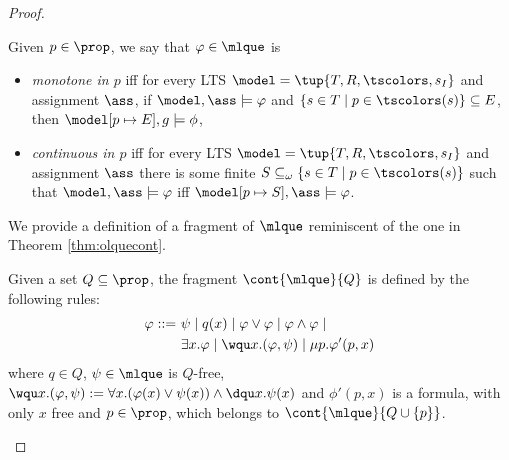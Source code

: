 \begin{proof}
%
%
\begin{definition}
Given $p \in \prop$, we say that $\varphi \in \mlque$ is
\begin{itemize}
\item \emph{monotone in $p$} iff for every LTS $\model=\tup{T,R,\tscolors, s_I}$ and assignment $\ass$, if $\model, \ass \models \varphi$ and $ \{s \in T \mid p\in \tscolors(s)\} \subseteq E$, then $\model[p \mapsto E], g\models \phi$,

\item %
    \emph{continuous in $p$} iff for every LTS $\model=\tup{T,R,\tscolors, s_I}$ and assignment $\ass$ there is some finite $S \subseteq_\omega \{s \in T \mid p\in \tscolors(s)\}$ such that $\model, \ass \models \varphi$ iff $\model[p \mapsto S], \ass \models \varphi$.
\end{itemize}
\end{definition}

We provide a definition of a fragment of $\mlque$ reminiscent of the one in
Theorem \ref{thm:olquecont}.
\begin{definition}
Given a set $Q\subseteq \prop$, the fragment $\cont{\mlque}{Q}$ is defined by the following rules:
\begin{align*}
\varphi ::=\ & \psi \mid q(x) \mid \varphi \lor \varphi \mid \varphi \land \varphi \mid\\
& \exists x.\varphi \mid \wqu x.(\varphi,\psi) \mid \mu p.\varphi'(p,x)
\end{align*}
%
where $q \in Q$,
$\psi \in \mlque$ is $Q$-free,
$\wqu x.(\varphi,\psi)
:= \forall x.(\varphi(x) \lor \psi(x)) \land \dqu x.\psi(x)$ and $\phi'(p,x)$
is a formula, with only $x$ free and $p \in \prop$, which belongs to
$\cont{\mlque}{Q \cup\{p\}}$.
\end{definition}


\end{proof}
